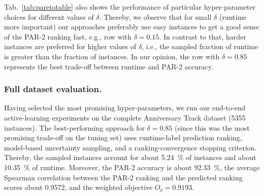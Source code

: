 \documentclass[runningheads]{llncs}
\begin{document}
Tab.~\ref{tab:paretotable} also shows the performance of particular hyper-parameter choices for different values of $\delta$.
Thereby, we observe that for small $\delta$ (runtime more important) our approaches preferably use easy instances to get a good sense of the PAR-2 ranking fast, e.g., row with $\delta = 0.15$.
In contrast to that, harder instances are preferred for higher values of $\delta$, i.e., the sampled fraction of runtime is greater than the fraction of instances.
In our opinion, the row with $\delta = 0.85$ represents the best trade-off between runtime and PAR-2 accuracy.

\subsubsection{Full dataset evaluation.}
Having selected the most promising hyper-parameters, we run our end-to-end active-learning experiments on the complete Anniversary Track dataset (5355 instances).
The best-performing approach for $\delta = 0.85$ (since this was the most promising trade-off on the tuning set) uses runtime-label prediction ranking, model-based uncertainty sampling, and a ranking-convergence stopping criterion.
Thereby, the sampled instances account for about \SI{5.24}{\%} of instances and about \SI{10.35}{\%} of runtime.
Moreover, the PAR-2 accuracy is about \SI{92.33}{\%}, the average Spearman correlation between the PAR-2 ranking and the predicted ranking scores about \SI{0.9572}{}, and the weighted objective $O_{\delta} = 0.9193$.
\end{document}
